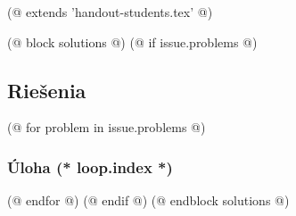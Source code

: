 (@ extends 'handout-students.tex' @)

(@ block solutions @)
    \newpage
    (@ if issue.problems @)
        \subsection{Riešenia}
        (@ for problem in issue.problems @)
            \subsubsection{Úloha (* loop.index *)}
        (@ endfor @)
    (@ endif @)
(@ endblock solutions @)

